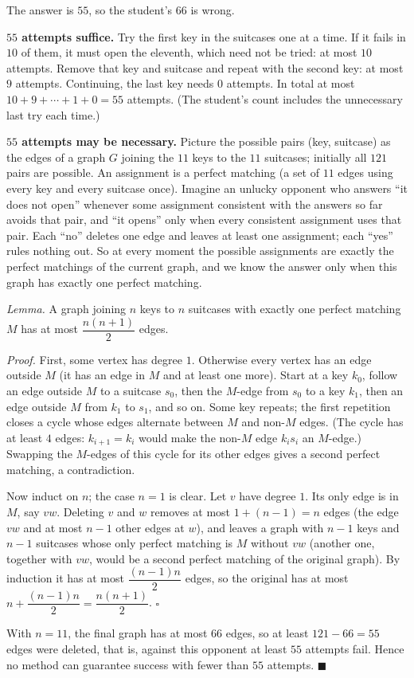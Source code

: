 The answer is $\boxed{55}$, so the student's $66$ is wrong.

\textbf{$55$ attempts suffice.} Try the first key in the suitcases one at a time. If it fails in $10$ of them, it must open the eleventh, which need not be tried: at most $10$ attempts. Remove that key and suitcase and repeat with the second key: at most $9$ attempts. Continuing, the last key needs $0$ attempts. In total at most $10+9+\cdots+1+0=55$ attempts. (The student's count includes the unnecessary last try each time.)

\textbf{$55$ attempts may be necessary.} Picture the possible pairs (key, suitcase) as the edges of a graph $G$ joining the $11$ keys to the $11$ suitcases; initially all $121$ pairs are possible. An assignment is a perfect matching (a set of $11$ edges using every key and every suitcase once). Imagine an unlucky opponent who answers ``it does not open'' whenever some assignment consistent with the answers so far avoids that pair, and ``it opens'' only when every consistent assignment uses that pair. Each ``no'' deletes one edge and leaves at least one assignment; each ``yes'' rules nothing out. So at every moment the possible assignments are exactly the perfect matchings of the current graph, and we know the answer only when this graph has exactly one perfect matching.

\emph{Lemma.} A graph joining $n$ keys to $n$ suitcases with exactly one perfect matching $M$ has at most $\dfrac{n(n+1)}{2}$ edges.

\emph{Proof.} First, some vertex has degree $1$. Otherwise every vertex has an edge outside $M$ (it has an edge in $M$ and at least one more). Start at a key $k_0$, follow an edge outside $M$ to a suitcase $s_0$, then the $M$-edge from $s_0$ to a key $k_1$, then an edge outside $M$ from $k_1$ to $s_1$, and so on. Some key repeats; the first repetition closes a cycle whose edges alternate between $M$ and non-$M$ edges. (The cycle has at least $4$ edges: $k_{i+1}=k_i$ would make the non-$M$ edge $k_is_i$ an $M$-edge.) Swapping the $M$-edges of this cycle for its other edges gives a second perfect matching, a contradiction.

Now induct on $n$; the case $n=1$ is clear. Let $v$ have degree $1$. Its only edge is in $M$, say $vw$. Deleting $v$ and $w$ removes at most $1+(n-1)=n$ edges (the edge $vw$ and at most $n-1$ other edges at $w$), and leaves a graph with $n-1$ keys and $n-1$ suitcases whose only perfect matching is $M$ without $vw$ (another one, together with $vw$, would be a second perfect matching of the original graph). By induction it has at most $\dfrac{(n-1)n}{2}$ edges, so the original has at most $n+\dfrac{(n-1)n}{2}=\dfrac{n(n+1)}{2}$. $\square$

With $n=11$, the final graph has at most $66$ edges, so at least $121-66=55$ edges were deleted, that is, against this opponent at least $55$ attempts fail. Hence no method can guarantee success with fewer than $55$ attempts. $\blacksquare$
